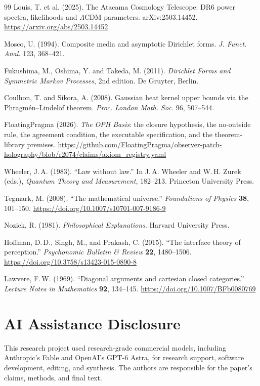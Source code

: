\documentclass[11pt]{article}
\theoremstyle{definition}
\theoremstyle{remark}
\begin{document}
{\begin{thebibliography}{99}
Louis, T. et al. (2025). The Atacama Cosmology Telescope: DR6 power spectra,
likelihoods and $\Lambda$CDM parameters. arXiv:2503.14452.
\url{https://arxiv.org/abs/2503.14452}

Mosco, U. (1994). Composite media and asymptotic Dirichlet forms.
\emph{J. Funct. Anal.} 123, 368--421.

Fukushima, M., Oshima, Y. and Takeda, M. (2011). \emph{Dirichlet Forms and
Symmetric Markov Processes}, 2nd edition. De Gruyter, Berlin.

Coulhon, T. and Sikora, A. (2008). Gaussian heat kernel upper bounds via the
Phragm\'en--Lindel\"of theorem. \emph{Proc. London Math. Soc.} 96, 507--544.

FloatingPragma (2026). \emph{The OPH Basis}: the closure hypothesis, the
no-outside rule, the agreement condition, the executable specification, and
the theorem-library premises.
\url{https://github.com/FloatingPragma/observer-patch-holography/blob/r2074/claims/axiom_registry.yaml}

Wheeler, J.\,A. (1983). ``Law without law.'' In J.\,A. Wheeler and
W.\,H. Zurek (eds.), \emph{Quantum Theory and Measurement}, 182--213.
Princeton University Press.

Tegmark, M. (2008). ``The mathematical universe.'' \emph{Foundations of Physics} \textbf{38}, 101--150. \url{https://doi.org/10.1007/s10701-007-9186-9}

Nozick, R. (1981). \emph{Philosophical Explanations}. Harvard University
Press.

Hoffman, D.\,D., Singh, M., and Prakash, C. (2015). ``The interface theory of perception.'' \emph{Psychonomic Bulletin \& Review} \textbf{22}, 1480--1506. \url{https://doi.org/10.3758/s13423-015-0890-8}

Lawvere, F.\,W. (1969). ``Diagonal arguments and cartesian closed categories.'' \emph{Lecture Notes in Mathematics} \textbf{92}, 134--145. \url{https://doi.org/10.1007/BFb0080769}



\end{thebibliography}}

\section*{AI Assistance Disclosure}
This research project used research-grade commercial models, including
Anthropic's Fable and OpenAI's GPT-6 Astra, for research support, software
development, editing, and synthesis. The authors are responsible for the
paper's claims, methods, and final text.
\end{document}
